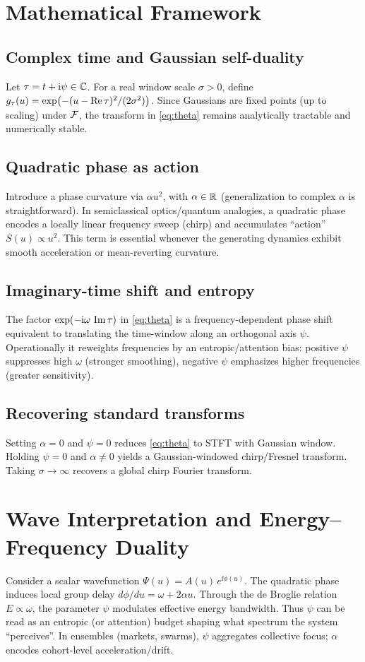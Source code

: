 \documentclass[11pt]{article}
\begin{document}
\section{Mathematical Framework}
\subsection{Complex time and Gaussian self-duality}
Let $\tau=t+\mathrm{i}\psi\in\mathbb{C}$. For a real window scale $\sigma>0$, define $g_{\tau}(u)=\exp(-(u-\operatorname{Re}\tau)^2/(2\sigma^2))$. Since Gaussians are fixed points (up to scaling) under $\mathcal{F}$, the transform in \eqref{eq:theta} remains analytically tractable and numerically stable.

\subsection{Quadratic phase as action}
Introduce a phase curvature via $\alpha u^2$, with $\alpha\in\mathbb{R}$ (generalization to complex $\alpha$ is straightforward). In semiclassical optics/quantum analogies, a quadratic phase encodes a locally linear frequency sweep (chirp) and accumulates ``action'' $S(u)\propto u^2$. This term is essential whenever the generating dynamics exhibit smooth acceleration or mean-reverting curvature.

\subsection{Imaginary-time shift and entropy}
The factor $\exp(-\mathrm{i}\omega\,\operatorname{Im}\tau)$ in \eqref{eq:theta} is a frequency-dependent phase shift equivalent to translating the time-window along an orthogonal axis $\psi$. Operationally it reweights frequencies by an entropic/attention bias: positive $\psi$ suppresses high $\omega$ (stronger smoothing), negative $\psi$ emphasizes higher frequencies (greater sensitivity).

\subsection{Recovering standard transforms}
Setting $\alpha=0$ and $\psi=0$ reduces \eqref{eq:theta} to STFT with Gaussian window. Holding $\psi=0$ and $\alpha\neq 0$ yields a Gaussian-windowed chirp/Fresnel transform. Taking $\sigma\to\infty$ recovers a global chirp Fourier transform.

\section{Wave Interpretation and Energy--Frequency Duality}
Consider a scalar wavefunction $\Psi(u)=A(u)\,e^{\ii\phi(u)}$. The quadratic phase induces local group delay $d\phi/du=\omega+2\alpha u$. Through the de Broglie relation $E\!\propto\!\omega$, the parameter $\psi$ modulates effective energy bandwidth. Thus $\psi$ can be read as an entropic (or attention) budget shaping what spectrum the system ``perceives''. In ensembles (markets, swarms), $\psi$ aggregates collective focus; $\alpha$ encodes cohort-level acceleration/drift.
\end{document}
